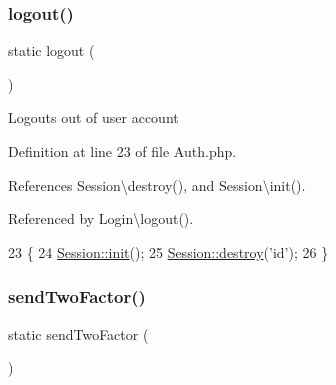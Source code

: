 \hypertarget{class_auth_a1e34160e903835a43123f538e93457a2}{}\label{class_auth_a1e34160e903835a43123f538e93457a2} 
\subsubsection{\texorpdfstring{logout()}{logout()}}
{\footnotesize\ttfamily static logout (\begin{DoxyParamCaption}{ }\end{DoxyParamCaption})\hspace{0.3cm}{\ttfamily [static]}}

Logouts out of user account 

Definition at line 23 of file Auth.\+php.



References Session\textbackslash{}destroy(), and Session\textbackslash{}init().



Referenced by Login\textbackslash{}logout().


\begin{DoxyCode}
23                                     \{
24         \hyperlink{class_session_a9f0be6ae273d3669e11c29910a0be338}{Session::init}();
25         \hyperlink{class_session_a84a343032e96995b7c252c719ddc764b}{Session::destroy}(\textcolor{stringliteral}{'id'});
26     \}
\end{DoxyCode}
\hypertarget{class_auth_a630afde0cf1e1c509b51e8686c8312ac}{}\label{class_auth_a630afde0cf1e1c509b51e8686c8312ac} 
\subsubsection{\texorpdfstring{send\+Two\+Factor()}{sendTwoFactor()}}
{\footnotesize\ttfamily static send\+Two\+Factor (\begin{DoxyParamCaption}{ }\end{DoxyParamCaption})\hspace{0.3cm}{\ttfamily [static]}}

